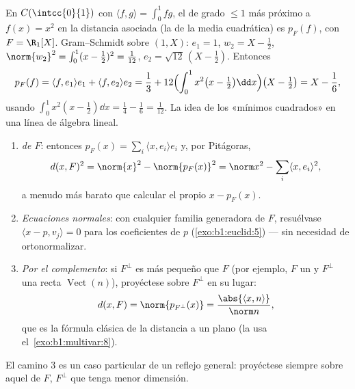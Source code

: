 \begin{example}\label{ex:b1:euclid:bestapprox}
En $C(\intcc{0}{1})$ con $\langle f, g\rangle = \int_0^1 fg$, el
 de grado $\leq 1$ más próximo a $f(x) = x^2$ en la
distancia asociada (la de la media cuadrática) es $p_F(f)$, con
$F = \R_1[X]$. Gram--Schmidt sobre $(1, X)$: $e_1 = 1$,
$w_2 = X - \frac12$,
$\norm{w_2}^2 = \int_0^1 (x - \frac12)^2 = \frac{1}{12}$,
$e_2 = \sqrt{12}\,(X - \tfrac12)$. Entonces
\[
p_F(f) = \langle f, e_1\rangle e_1 + \langle f, e_2\rangle e_2
= \frac13 + 12\Bigl(\int_0^1 x^2\bigl(x - \tfrac12\bigr)\dd
x\Bigr)\bigl(X - \tfrac12\bigr)
= X - \frac{1}{6},
\]
usando $\int_0^1 x^2(x - \frac12)\dd x = \frac14 - \frac16 =
\frac{1}{12}$. La idea de los «mínimos cuadrados» en una línea de
álgebra lineal.
\end{example}

\begin{method}
\label{met:b1:euclid:distance}
\begin{enumerate}
  \item \emph{  de $F$}: entonces
        $p_F(x) = \sum_i \langle x, e_i\rangle e_i$ y, por Pitágoras,
        \[
        d(x, F)^2 = \norm{x}^2 - \norm{p_F(x)}^2
        = \norm x^2 - \sum_i \langle x, e_i\rangle^2 ,
        \]
        a menudo más barato que calcular el propio $x - p_F(x)$.
  \item \emph{Ecuaciones normales}: con cualquier familia
        generadora de $F$, resuélvase
        $\langle x - p, v_j\rangle = 0$ para los coeficientes de $p$
        (\cref{exo:b1:euclid:5}) --- sin necesidad de
        ortonormalizar.
  \item \emph{Por el complemento}: si $F^\perp$ es más pequeño que
        $F$ (por ejemplo, $F$ un  y $F^\perp$ una recta
        $\operatorname{Vect}(n)$), proyéctese sobre $F^\perp$ en su
        lugar:
        \[
        d(x, F) = \norm{p_{F^\perp}(x)} =
        \frac{\abs{\langle x, n\rangle}}{\norm n} ,
        \]
        que es la fórmula clásica de la distancia a un plano (la usa
        el~\cref{exo:b1:multivar:8}).
\end{enumerate}
El camino 3 es un caso particular de un reflejo general: proyéctese
siempre sobre aquel de $F$, $F^\perp$ que tenga menor dimensión.
\end{method}

